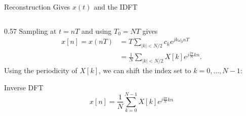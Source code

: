 \begin{frame}{Reconstruction Gives $x(t)$ and the IDFT}
\begin{columns}[T]
\begin{column}{0.57\textwidth}
      Sampling at $t=nT$ and using $T_0=NT$ gives
      \begin{align*}
        x[n]=x(nT)
        &= T\sum_{|k|<N/2} c_k e^{jk\omega_0 nT} \\
        &= \frac{1}{N}\sum_{|k|<N/2} X[k]e^{j\frac{2\pi}{N}kn}.
      \end{align*}
      Using the periodicity of $X[k]$, we can shift the index set to $k=0,\dots,N-1$:
      \begin{conceptbox}{Inverse DFT}
        \vspace{-0.2cm}
        \begin{equation*}
          x[n]=\frac{1}{N}\sum_{k=0}^{N-1} X[k]e^{j\frac{2\pi}{N}kn}
        \end{equation*}
      \end{conceptbox}
    \end{column}
  \end{columns}
\end{frame}



